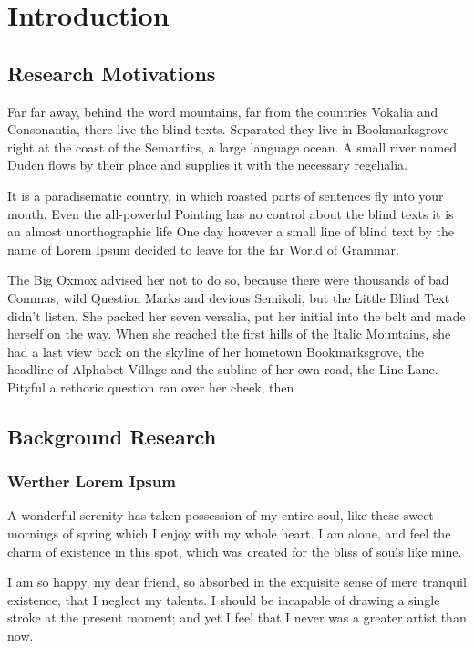 \chapter{Introduction}

\section{Research Motivations}\label{introduction:research_motivations}

    Far far away, behind the word mountains, far from the countries Vokalia and Consonantia, there live the blind texts. Separated they live in Bookmarksgrove right at the coast of the Semantics, a large language ocean. A small river named Duden flows by their place and supplies it with the necessary regelialia.

    It is a paradisematic country, in which roasted parts of sentences fly into your mouth. Even the all-powerful Pointing has no control about the blind texts it is an almost unorthographic life One day however a small line of blind text by the name of Lorem Ipsum decided to leave for the far World of Grammar.

    The Big Oxmox\cite{ryu2024diffusion} advised her not to do so, because there were thousands of bad Commas, wild Question Marks and devious Semikoli, but the Little Blind Text didn’t listen. She packed her seven versalia, put her initial into the belt and made herself on the way. When she reached the first hills of the Italic Mountains, she had a last view back on the skyline of her hometown Bookmarksgrove, the headline of Alphabet Village and the subline of her own road, the Line Lane. Pityful a rethoric question ran over her cheek, then

\section{Background Research}\label{introduction:background_research}

\subsection{Werther Lorem Ipsum}

    A wonderful serenity has taken possession of my entire soul, like these sweet mornings of spring which I enjoy with my whole heart. I am alone, and feel the charm of existence in this spot, which was created for the bliss of souls like mine.

    I am so happy, my dear friend, so absorbed in the exquisite sense of mere tranquil existence, that I neglect my talents. I should be incapable of drawing a single stroke at the present moment; and yet I feel that I never was a greater artist than now.

